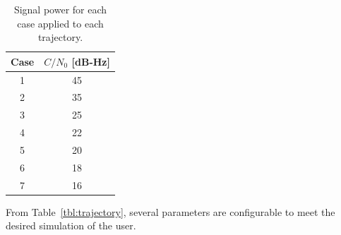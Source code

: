 \begin{table}[!ht]
    \caption{Signal power for each case applied to each trajectory.}\label{tbl:interferenceCases}
    \centering
    \begin{tabular}{cc}
        \toprule
        Case & \(C/N_0\) [dB-Hz] \\
        \midrule
        1    & 45                \\
        2    & 35                \\
        3    & 25                \\
        4    & 22                \\
        5    & 20                \\
        6    & 18                \\
        7    & 16                \\
        \bottomrule
    \end{tabular}
\end{table}

From Table~\ref{tbl:trajectory}, several parameters are configurable to meet the desired simulation of the user.

